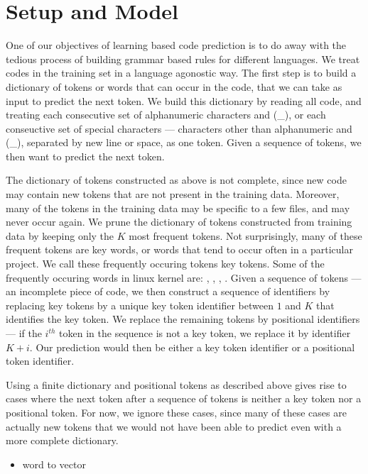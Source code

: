 \section{Setup and Model}
\label{sec:model}

\noindent
One of our objectives of learning based code prediction is to do away with the
tedious process of building grammar based rules for different languages.
We treat codes in the training set in a language agonostic way. The first step
is to build a dictionary of tokens or words that can occur in the code, that we
can take as input to predict the next token. We build this dictionary by
reading all code, and treating each consecutive set of alphanumeric characters
and (\_), or each conseuctive set of special characters --- characters other
than alphanumeric and (\_), separated by new line or space, as one token.
Given a sequence of tokens, we then want to predict the next token.

The dictionary of tokens constructed as above is not complete, since new code
may contain new tokens that are not present in the training data. Moreover,
many of the tokens in the training data may be specific to a few files, and may
never occur again. We prune the dictionary of tokens constructed from training
data by keeping only the $K$ most frequent tokens. Not surprisingly, many of
these frequent tokens are key words, or words that tend to occur often in a
particular project. We call these frequently occuring tokens key tokens.
Some of the frequently occuring words in linux kernel are:
\texttt{}, \texttt{}, \texttt{}, \texttt{}.
Given a sequence of tokens --- an incomplete piece of code, we then construct a
sequence of identifiers by replacing
key tokens by a unique key token identifier between $1$ and $K$ that identifies
the key token.
We replace the remaining tokens by positional identifiers --- if the $i^{th}$
token in the sequence is not a key token, we replace it by identifier $K+i$. Our
prediction would then be either a key token identifier or a positional token
identifier.

Using a finite dictionary and positional tokens as described above gives rise
to cases where the next token after a sequence of tokens is neither a key token
nor a positional token. For now, we ignore these cases, since many of these
cases are actually new tokens that we would not have been able to predict even
with a more complete dictionary.

\begin{itemize}
  \item word to vector
\end{itemize}
